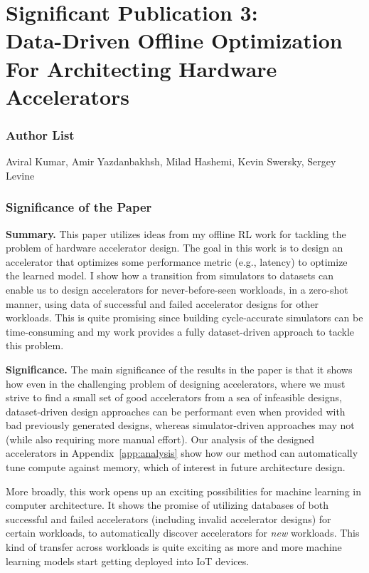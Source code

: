 \documentclass{article}
\title{\centering{Data-Driven Offline Optimization for\\ Architecting Hardware Accelerators}}
\author{%
  \quad \quad \quad \quad \quad \quad \quad \quad \quad {Aviral Kumar$^{\dagger, *}$~~~ Amir Yazdanbakhsh$^{\dagger}$} \vspace{0.05cm}\\
  \quad \quad \quad \quad \quad \quad \quad \quad \textbf{Milad Hashemi~~~ Kevin Swersky~~~ Sergey Levine$^{*}$} \vspace{0.2cm}\\
  \quad \quad \quad \quad \quad \quad Google Research ~~$^*$ UC Berkeley~~~~ ($^\dagger$ Equal Contribution) \vspace{0.05cm}\\
  \quad \quad \quad \quad \quad \quad~~~  \texttt{aviralk@berkeley.edu, ayazdan@google.com}
}
\begin{document}
\part*{\Large{Significant Publication 3: \\ Data-Driven Offline Optimization For Architecting Hardware Accelerators}}

\section*{Author List} Aviral Kumar, Amir Yazdanbakhsh, Milad Hashemi, Kevin Swersky, Sergey Levine

\section*{Significance of the Paper} 

\textbf{Summary.} This paper utilizes ideas from my offline RL work for tackling the problem of hardware accelerator design. The goal in this work is to design an accelerator that optimizes some performance metric (e.g., latency) to optimize the learned model. I show how a transition from simulators to datasets can enable us to design accelerators for never-before-seen workloads, in a zero-shot manner, using data of successful and failed accelerator designs for other workloads. This is quite promising since building cycle-accurate simulators can be time-consuming and my work provides a fully dataset-driven approach to tackle this problem.  


\textbf{Significance.} The main significance of the results in the paper is that it shows how even in the challenging problem of designing accelerators, where we must strive to find a small set of good accelerators from a sea of infeasible designs, dataset-driven design approaches can be performant even when provided with bad previously generated designs, whereas simulator-driven approaches may not (while also requiring more manual effort). Our analysis of the designed accelerators in Appendix~\ref{app:analysis} show how our method can automatically tune compute against memory, which of interest in future architecture design. 

More broadly, this work opens up an exciting possibilities for machine learning in computer architecture. It shows the promise of utilizing databases of both successful and failed accelerators (including invalid accelerator designs) for certain workloads, to automatically discover accelerators for \emph{new} workloads. This kind of transfer across workloads is quite exciting as more and more machine learning models start getting deployed into IoT devices.
\end{document}
